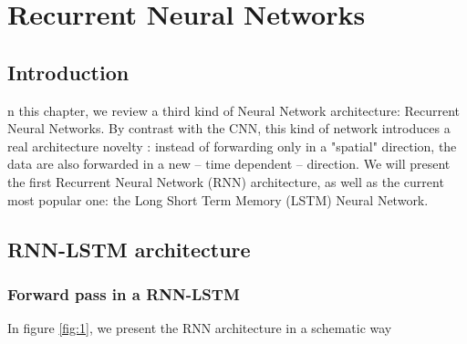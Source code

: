 \chapter{Recurrent Neural Networks} \label{sec:chapterRNN}

\minitoc

\section{Introduction}

n this chapter, we review a third kind of Neural Network architecture: Recurrent Neural Networks\cite{GravesA2016}. By contrast with the CNN, this kind of network introduces a real architecture novelty : instead of forwarding only in a "spatial" direction, the data are also forwarded in a new -- time dependent -- direction. We will present the first Recurrent Neural Network (RNN) architecture, as well as the current most popular one: the Long Short Term Memory (LSTM) Neural Network. 

\section{RNN-LSTM architecture}

\subsection{Forward pass in a RNN-LSTM}

In figure \ref{fig:1}, we present the RNN architecture in a schematic way

